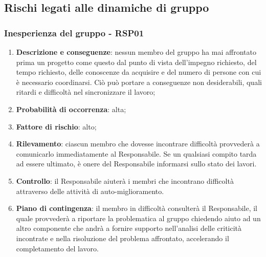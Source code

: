 \subsection{Rischi legati alle dinamiche di gruppo}
	\subsubsection{Inesperienza del gruppo - RSP01}	
	\begin{enumerate}
		\item \textbf{Descrizione e conseguenze}: nessun membro del gruppo ha mai affrontato prima un progetto come questo dal punto di vista dell'impegno richiesto, del tempo richiesto, delle conoscenze da acquisire e del numero di persone con cui è necessario coordinarsi. Ciò può portare a conseguenze non desiderabili, quali ritardi e difficoltà nel sincronizzare il lavoro;
		\item \textbf{Probabilità di occorrenza}: alta;
		\item \textbf{Fattore di rischio}: alto;
		\item \textbf{Rilevamento}: ciascun membro che dovesse incontrare difficoltà provvederà a comunicarlo immediatamente al Responsabile. Se un qualsiasi compito tarda ad essere ultimato, è onere del Responsabile informarsi sullo stato dei lavori. 
		\item \textbf{Controllo}: il Responsabile aiuterà i membri che incontrano difficoltà attraverso delle attività di auto-miglioramento.
		\item \textbf{Piano di contingenza}: il membro in difficoltà consulterà il Responsabile, il quale provvederà a riportare la problematica al gruppo chiedendo aiuto ad un altro componente che andrà a fornire supporto nell'analisi delle criticità incontrate e nella risoluzione del problema affrontato, accelerando il completamento del lavoro.
	\end{enumerate}
	
